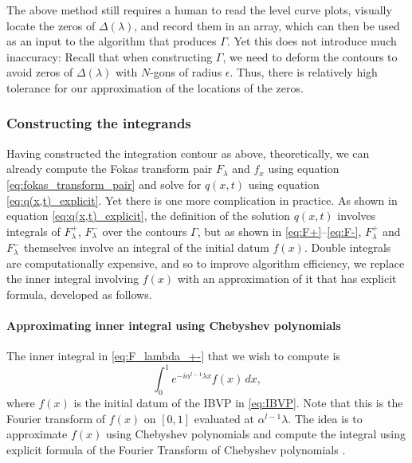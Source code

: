 \documentclass[12pt, oneside, a4paper]{article}
\begin{document}
The above method still requires a human to read the level curve plots, visually locate the zeros of $\Delta(\lambda)$, and record them in an array, which can then be used as an input to the algorithm that produces $\Gamma$. Yet this does not introduce much inaccuracy: Recall that when constructing $\Gamma$, we need to deform the contours to avoid zeros of $\Delta(\lambda)$ with $N$-gons of radius $\epsilon$. Thus, there is relatively high tolerance for our approximation of the locations of the zeros.

\subsubsection{Constructing the integrands}\label{sec:constructing_integrands}

Having constructed the integration contour as above, theoretically, we can already compute the Fokas transform pair $F_\lambda$ and $f_x$ using equation \eqref{eq:fokas_transform_pair} and solve for $q(x,t)$ using equation \eqref{eq:q(x,t)_explicit}.
Yet there is one more complication in practice. As shown in equation \eqref{eq:q(x,t)_explicit}, the definition of the solution $q(x,t)$ involves integrals of $F_\lambda^+$, $F_\lambda^-$ over the contours $\Gamma$, but as shown in \eqref{eq:F+}--\eqref{eq:F-}, $F_\lambda^+$ and $F_\lambda^-$ themselves involve an integral of the initial datum $f(x)$. Double integrals are computationally expensive, and so to improve algorithm efficiency, we replace the inner integral involving $f(x)$ with an approximation of it that has explicit formula, developed as follows.

\paragraph{Approximating inner integral using Chebyshev polynomials}\mbox{}\label{par:approximate_integral_chebyshev}

The inner integral in \eqref{eq:F_lambda_+-} that we wish to compute is
\[\int_0^1 e^{-i\alpha^{l-1}\lambda x}f(x)\,dx,\]
where $f(x)$ is the initial datum of the IBVP in \eqref{eq:IBVP}.
Note that this is the Fourier transform of $f(x)$ on $[0,1]$ evaluated at $\alpha^{l-1}\lambda$.
The idea is to approximate $f(x)$ using Chebyshev polynomials and compute the integral using explicit formula of the Fourier Transform of Chebyshev polynomials \cite{Fokas2012}.
\end{document}
